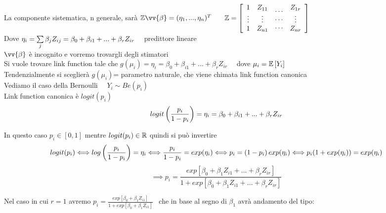 La componente sistematica, n generale, sarà $\ZZ \vv{\beta} = (\eta_1,...,\eta_n)^T$ \ \ \ $\mathbb Z = \left[ \begin{array}{c}
     1  \\
     \vdots  \\
     1
\end{array} \begin{array}{c}
     Z_{11}  \\
     \vdots  \\
     Z_{n1}
\end{array}  \begin{array}{c}
     \dots  \\
      \dots \\
     \dots
\end{array} \begin{array}{c}
     Z_{1r}  \\
     \vdots  \\
     Z_{nr}
\end{array} \right]$\\

Dove $\eta_i= \sum\limits_{j}^{} \beta_jZ_{ij} = \beta_0 + \beta_{i1} + ... + \beta_rZ_{ir}$ \ \ predittore lineare\\
$\vv{\beta}$ è incognito e vorremo trovargli degli stimatori\\

Si vuole trovare link function tale che $g(\mu_i)= \eta_i = \beta_0 + \beta_{i1} + ... + \beta_rZ_{ir}$ \ \ dove $\mu_i=\mathbb{E} \left[ Y_i \right]$ \\ Tendenzialmente si sceglierà $g(\mu_i)$= parametro naturale, che viene chimata link function canonica\\


Vediamo il caso della Bernoulli \ \ $Y_i \sim Be(p_i)$\\
Link function canonica è $logit(p_i)$
\[
logit\left(\dfrac{p_i}{1-p_i}\right)= \eta_i= \beta_0 + \beta_{i1} + ... + \beta_rZ_{ir}
\]

In questo caso $p_i \in [0,1]$ mentre $logit(p_i) \in \mathbb R$ quindi si può invertire
\[
logit(p_i) \Longleftrightarrow log\left(\dfrac{p_i}{1-p_i}\right) = \eta_i \Longleftrightarrow \dfrac{p_i}{1-p_i} = exp(\eta_i) \Longleftrightarrow p_i = (1-p_i)\, exp(\eta_i) \Longleftrightarrow p_i (1+exp(\eta_i)) = exp(\eta_i)
\]
\[
\implies p_i=\frac{exp[\beta_0+\beta_1Z_{i1}+ ... + \beta_r Z_{ir}]}{1 + exp[\beta_0+\beta_1Z_{i1}+ ... + \beta_r Z_{ir}]}
\]

Nel caso in cui $r=1$ avremo $p_i=\frac{exp[\beta_0+\beta_1Z_{i1}]}{1 + exp[\beta_0+\beta_1Z_{i1}]}$ \ che in base al segno di $\beta_1$ avrà andamento del tipo:

